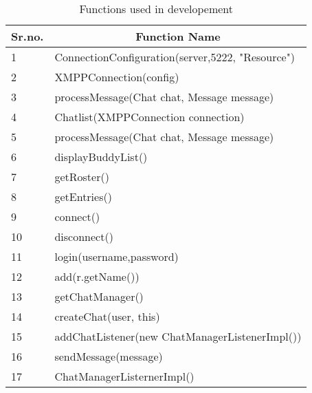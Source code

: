 \documentclass{SureshLimkar}
\begin{document}
\begin{table}[h]
\begin{tabular}{|l|l|}
\hline
\multicolumn{1}{|c|}{\textbf{Sr.no.}} & \multicolumn{1}{c|}{\textbf{Function Name}}      \\ \hline
1                                     & ConnectionConfiguration(server,5222, "Resource") \\ \hline
2                                     & XMPPConnection(config)                           \\ \hline
3                                     & processMessage(Chat chat, Message message)       \\ \hline
4                                     & Chatlist(XMPPConnection connection)              \\ \hline
5                                     & processMessage(Chat chat, Message message)       \\ \hline
6                                     & displayBuddyList()                               \\ \hline
7                                     & getRoster()                                      \\ \hline
8                                     & getEntries()                                     \\ \hline
9                                     & connect()                                        \\ \hline
10                                    & disconnect()                                     \\ \hline
11                                    & login(username,password)                         \\ \hline
12                                    & add(r.getName())                                 \\ \hline
13                                    & getChatManager()                                 \\ \hline
14                                    & createChat(user, this)                           \\ \hline
15                                    & addChatListener(new ChatManagerListenerImpl())   \\ \hline
16                                    & sendMessage(message)                             \\ \hline
17                                    & ChatManagerListernerImpl()                       \\ \hline
\end{tabular}
\caption{Functions used in developement}

\end{table}
\end{document}
